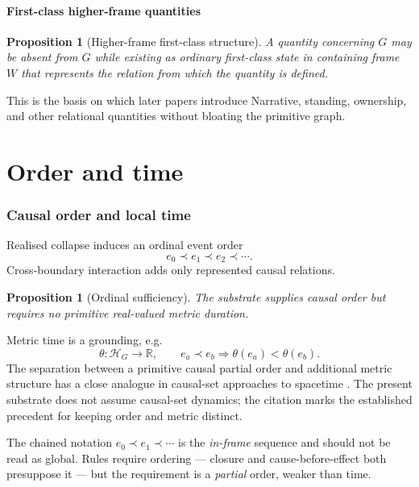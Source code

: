 \documentclass[11pt,a4paper]{article}
\newtheorem{proposition}[definition]{Proposition}
\theoremstyle{remark}\newtheorem{remark}[definition]{Remark}
\begin{document}
\subsection{First-class higher-frame quantities}\label{sec:higher-frame}
\begin{proposition}[Higher-frame first-class structure]\label{prop:higher-frame}
A quantity concerning $G$ may be absent from $G$ while existing as ordinary first-class state in containing frame $W$ that represents the relation from which the quantity is defined.
\end{proposition}
This is the basis on which later papers introduce Narrative, standing, ownership, and other relational quantities without bloating the primitive graph.

\part{Order and time}
\section{Causal order and local time}\label{sec:causal-order}
Realised collapse induces an ordinal event order
\[e_0\prec e_1\prec e_2\prec\cdots.\]
Cross-boundary interaction adds only represented causal relations.
\begin{proposition}[Ordinal sufficiency]\label{prop:ordinal}
The substrate supplies causal order but requires no primitive real-valued metric duration.
\end{proposition}
Metric time is a grounding, e.g.
\[\theta:\mathcal H_G\to\mathbb R,\qquad e_a\prec e_b\Rightarrow\theta(e_a)<\theta(e_b).\]
The separation between a primitive causal partial order and additional metric structure has a close analogue in causal-set approaches to spacetime \citep{bombelli1987}. The present substrate does not assume causal-set dynamics; the citation marks the established precedent for keeping order and metric distinct.

The chained notation $e_0\prec e_1\prec\cdots$ is the \emph{in-frame} sequence and should not be read as global. Rules require ordering --- closure and cause-before-effect both presuppose it --- but the requirement is a \emph{partial} order, weaker than time.
\end{document}
